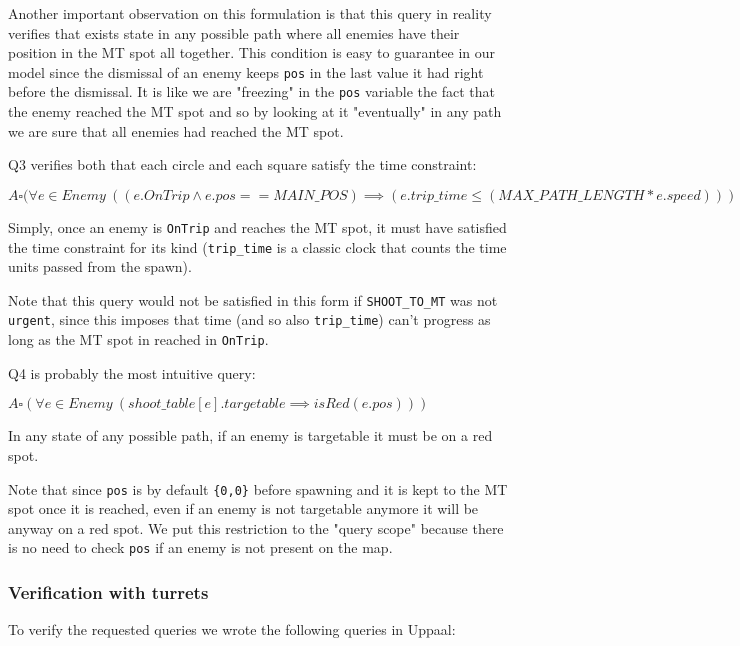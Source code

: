 \documentclass[
10pt, %
a4paper, %
oneside, %
headinclude,footinclude, %
BCOR5mm, %
]{scrartcl}
\begin{document}
				Another important observation on this formulation is that this query in reality verifies that exists state in any possible path where all enemies have their position in the MT spot all together. This condition is easy to guarantee in our model since the dismissal of an enemy keeps \texttt{pos} in the last value it had right before the dismissal. It is like we are "freezing" in the \texttt{pos} variable the fact that the enemy reached the MT spot and so by looking at it "eventually" in any path we are sure that all enemies had reached the MT spot.
				
				Q3 verifies both that each circle and each square satisfy the time constraint:
				\begin{center}
					$A\square(\forall e \in Enemy\ ((e.OnTrip \wedge e.pos==MAIN\_POS) \implies (e.trip\_time\leq(MAX\_PATH\_LENGTH*e.speed)))$
				\end{center}
				Simply, once an enemy is \texttt{OnTrip} and reaches the MT spot, it must have satisfied the time constraint for its kind (\texttt{trip\_time} is a classic clock that counts the time units passed from the spawn).
				
				Note that this query would not be satisfied in this form if \texttt{SHOOT\_TO\_MT} was not \texttt{urgent}, since this imposes that time (and so also \texttt{trip\_time}) can't progress as long as the MT spot in reached in \texttt{OnTrip}.
				
				Q4 is probably the most intuitive query:
				\begin{center}
					$A\square(\forall e \in Enemy\ (shoot\_table[e].targetable \implies isRed(e.pos)))$
				\end{center}
				In any state of any possible path, if an enemy is targetable it must be on a red spot.
				
				Note that since \texttt{pos} is by default \texttt{\{0,0\}} before spawning and it is kept to the MT spot once it is reached, even if an enemy is not targetable anymore it will be anyway on a red spot. We put this restriction to the "query scope" because there is no need to check \texttt{pos} if an enemy is not present on the map. 
			\subsubsection{Verification with turrets}
				To verify the requested queries we wrote the following queries in Uppaal:
				
\end{document}
